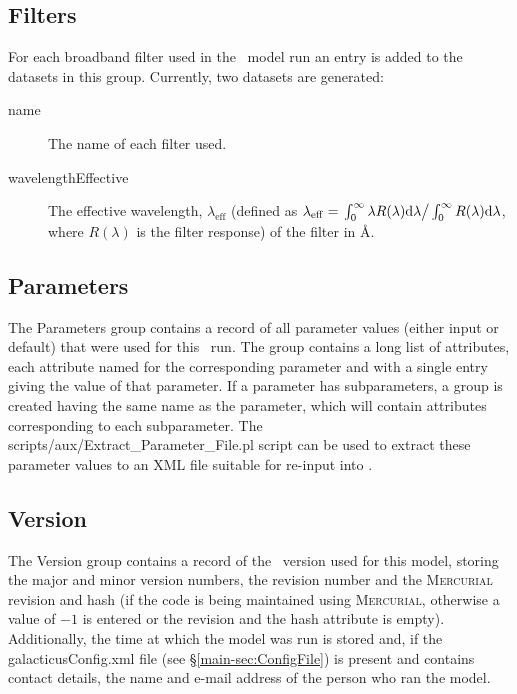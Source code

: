 \subsection{Filters}

For each broadband filter used in the \glc\ model run an entry is added to the datasets in this group. Currently, two datasets are generated:
\begin{description}
\item[{\normalfont \ttfamily name}] The name of each filter used.
\item[{\normalfont \ttfamily wavelengthEffective}] The effective wavelength, $\lambda_\mathrm{eff}$ (defined as $\lambda_\mathrm{eff}=\left. \int_0^\infty \lambda R(\lambda) \mathrm{d}\lambda \right/ \int_0^\infty R(\lambda) \mathrm{d}\lambda$, where $R(\lambda)$ is the filter response) of the filter in \AA.
\end{description}

\subsection{Parameters}

The {\normalfont \ttfamily Parameters} group contains a record of all parameter values (either input or default) that were used for this \glc\ run. The group contains a long list of attributes, each attribute named for the corresponding parameter and with a single entry giving the value of that parameter. If a parameter has subparameters, a group is created having the same name as the parameter, which will contain attributes corresponding to each subparameter. The {\normalfont \ttfamily scripts/aux/Extract\_Parameter\_File.pl} script can be used to extract these parameter values to an XML file suitable for re-input into \glc.

\subsection{Version}

The {\normalfont \ttfamily Version} group contains a record of the \glc\ version used for this model, storing the major and minor version numbers, the revision number and the {\normalfont \scshape Mercurial} revision and hash (if the code is being maintained using {\normalfont \scshape Mercurial}, otherwise a value of $-1$ is entered or the revision and the hash attribute is empty). Additionally, the time at which the model was run is stored and, if the {\normalfont \ttfamily galacticusConfig.xml} file (see \S\ref{main-sec:ConfigFile}) is present and contains contact details, the name and e-mail address of the person who ran the model.

